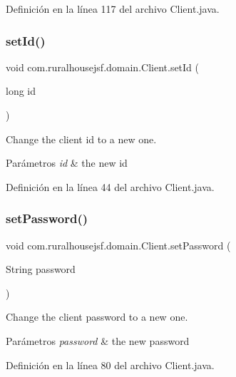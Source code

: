 Definición en la línea 117 del archivo Client.\+java.

\mbox{\label{a00164_a0e4914e375b61e50427b5fbd15c0948f}} 
\subsubsection{\texorpdfstring{setId()}{setId()}}
{\footnotesize\ttfamily void com.\+ruralhousejsf.\+domain.\+Client.\+set\+Id (\begin{DoxyParamCaption}\item[{long}]{id }\end{DoxyParamCaption})}



Change the client id to a new one. 


\begin{DoxyParams}{Parámetros}
{\em id} & the new id \\
\hline
\end{DoxyParams}


Definición en la línea 44 del archivo Client.\+java.

\mbox{\label{a00164_a89d703e0377510769b326334f31fbb8d}} 
\subsubsection{\texorpdfstring{setPassword()}{setPassword()}}
{\footnotesize\ttfamily void com.\+ruralhousejsf.\+domain.\+Client.\+set\+Password (\begin{DoxyParamCaption}\item[{String}]{password }\end{DoxyParamCaption})}



Change the client password to a new one. 


\begin{DoxyParams}{Parámetros}
{\em password} & the new password \\
\hline
\end{DoxyParams}


Definición en la línea 80 del archivo Client.\+java.

